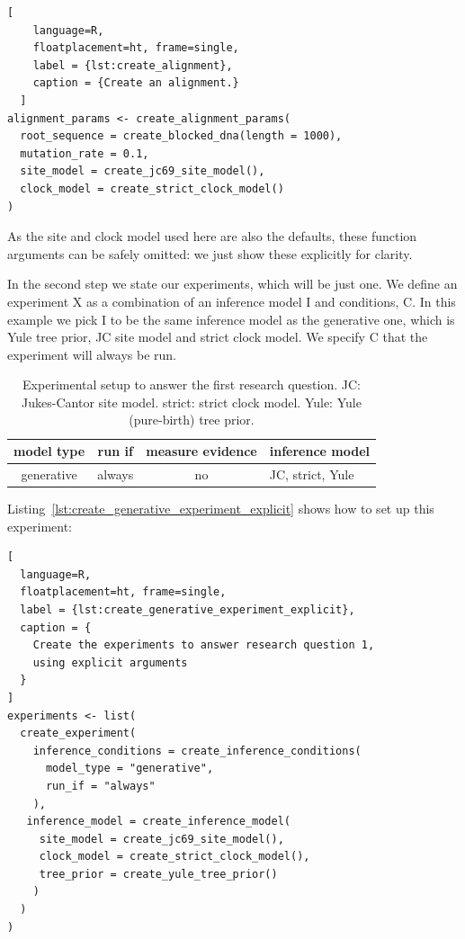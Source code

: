 \documentclass{article}
\begin{document}
\begin{lstlisting}[
    language=R,
    floatplacement=ht, frame=single,
    label = {lst:create_alignment}, 
    caption = {Create an alignment.}
  ]
alignment_params <- create_alignment_params(
  root_sequence = create_blocked_dna(length = 1000),
  mutation_rate = 0.1,
  site_model = create_jc69_site_model(),
  clock_model = create_strict_clock_model()
)
\end{lstlisting}

As the site and clock model used here are also the defaults, 
these function arguments can be safely omitted: we just show these
explicitly for clarity.

In the second step we state our experiments, which will be just one.
We define an experiment X as a combination of an inference model I
and conditions, C.
In this example we pick I to be the same inference model as the generative one,
which is Yule tree prior, JC site model and strict clock model.
We specify C that the experiment will always be run.

\begin{table}
  \begin{tabular}{ | c | c | c | l | }
    \hline
    \textbf{model type} & \textbf{run if} & \textbf{measure evidence} & \textbf{inference model} \\ 
    \hline
    generative & always & no & JC, strict, Yule \\
    \hline
  \end{tabular}
  \caption{
    Experimental setup to answer the first research question.
    JC: Jukes-Cantor site model.
    strict: strict clock model.
    Yule: Yule (pure-birth) tree prior.
  }
  \label{tbl:RQ1}
\end{table}

Listing~\ref{lst:create_generative_experiment_explicit} shows how to
set up this experiment:

\begin{lstlisting}[
  language=R, 
  floatplacement=ht, frame=single,
  label = {lst:create_generative_experiment_explicit},
  caption = {
    Create the experiments to answer research question 1, 
    using explicit arguments
  }
]
experiments <- list(
  create_experiment(
    inference_conditions = create_inference_conditions(
      model_type = "generative", 
      run_if = "always"
    ), 
   inference_model = create_inference_model(
     site_model = create_jc69_site_model(), 
     clock_model = create_strict_clock_model(), 
     tree_prior = create_yule_tree_prior()
    )
  )
)
\end{lstlisting}
\end{document}

